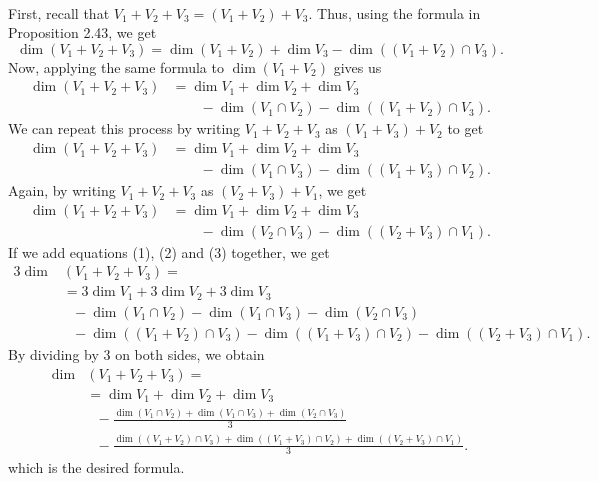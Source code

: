\begin{solution}
    \\ First, recall that $V_1 + V_2 + V_3 = (V_1 + V_2) + V_3$. Thus, using the formula in Proposition 2.43, we get
    $$\dim(V_1 + V_2 + V_3) = \dim(V_1 + V_2) + \dim V_3 - \dim((V_1 + V_2)\cap V_3).$$
    Now, applying the same formula to $\dim (V_1 + V_2)$ gives us
    \begin{align*}
        \dim(V_1 + V_2 + V_3) &= \dim V_1 + \dim V_2 + \dim V_3 \\ & \qquad - \dim(V_1 \cap V_2) - \dim((V_1 + V_2)\cap V_3). \tag*{(1)}
    \end{align*}
    We can repeat this process by writing $V_1 + V_2 + V_3$ as $(V_1 + V_3) + V_2$ to get
    \begin{align*}
        \dim(V_1 + V_2 + V_3) &= \dim V_1 + \dim V_2 + \dim V_3 \\ & \qquad - \dim(V_1 \cap V_3) - \dim((V_1 + V_3)\cap V_2). \tag*{(2)}
    \end{align*}
    Again, by writing $V_1 + V_2 + V_3$ as $(V_2 + V_3) + V_1$, we get
    \begin{align*}
        \dim(V_1 + V_2 + V_3) &= \dim V_1 + \dim V_2 + \dim V_3 \\ & \qquad - \dim(V_2 \cap V_3) - \dim((V_2 + V_3)\cap V_1). \tag*{(3)}
    \end{align*}
    If we add equations (1), (2) and (3) together, we get
    \begin{align*}
        3\dim & (V_1 + V_2 + V_3) = \\
        &= 3\dim V_1 + 3\dim V_2 + 3\dim V_3 \\
        & \ \ \ - \dim(V_1 \cap V_2) - \dim(V_1 \cap V_3) - \dim(V_2 \cap V_3) \\
        & \ \ \ - \dim((V_1 + V_2) \cap V_3) - \dim((V_1 + V_3) \cap V_2) - \dim((V_2 + V_3) \cap V_1).
    \end{align*}
    By dividing by 3 on both sides, we obtain
    \begin{align*}
        \dim & (V_1 + V_2 + V_3) = \\
        &= \dim V_1 + \dim V_2 + \dim V_3 \\
        & \ \ \ - \frac{\dim(V_1 \cap V_2) + \dim(V_1 \cap V_3) + \dim(V_2 \cap V_3)}{3} \\
        & \ \ \ - \frac{\dim((V_1 + V_2) \cap V_3) + \dim((V_1 + V_3) \cap V_2) + \dim((V_2 + V_3) \cap V_1)}{3}.
    \end{align*}
    which is the desired formula.
\end{solution}